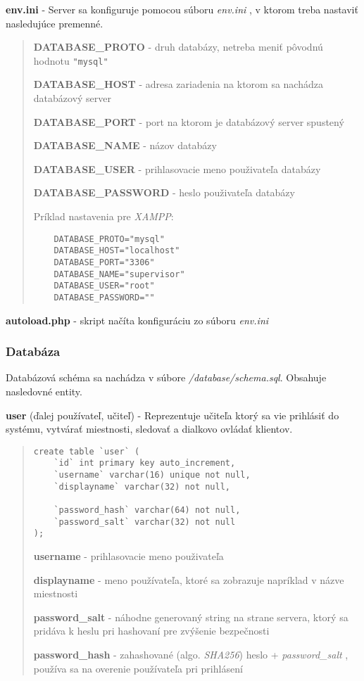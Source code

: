 \documentclass{article}
\newcommand{\filedesc}[1]{\vspace{0.3cm} \noindent \textbf{#1}}
\newcommand{\file}[1]{\emph{#1}}
\begin{document}
\filedesc{env.ini} - Server sa konfiguruje pomocou súboru \file{env.ini} , v ktorom treba nastaviť nasledujúce premenné.

\begin{quote}
  \filedesc{DATABASE{\_}PROTO} - druh databázy, netreba meniť pôvodnú hodnotu \texttt{"mysql"}

  \filedesc{DATABASE{\_}HOST} - adresa zariadenia na ktorom sa nachádza databázový server 

  \filedesc{DATABASE{\_}PORT} - port na ktorom je databázový server spustený

  \filedesc{DATABASE{\_}NAME} - názov databázy

  \filedesc{DATABASE{\_}USER} - prihlasovacie meno použivateľa databázy

  \filedesc{DATABASE{\_}PASSWORD} - heslo použivateľa databázy

  Príklad nastavenia pre \emph{XAMPP}:

  \begin{verbatim}
    DATABASE_PROTO="mysql"
    DATABASE_HOST="localhost"
    DATABASE_PORT="3306"
    DATABASE_NAME="supervisor"
    DATABASE_USER="root"
    DATABASE_PASSWORD=""
  \end{verbatim}
\end{quote}

\filedesc{autoload.php} - skript načíta konfiguráciu zo súboru \file{env.ini}

\subsubsection{Databáza}

Databázová schéma sa nachádza v súbore \file{/database/schema.sql}. Obsahuje nasledovné entity.

\filedesc{user} (ďalej používateľ, učiteľ) - Reprezentuje učiteľa ktorý sa vie prihlásiť do systému, vytvárať miestnosti, sledovať a dialkovo ovládať klientov.
\begin{quote}

\begin{verbatim}
create table `user` (
    `id` int primary key auto_increment,
    `username` varchar(16) unique not null,
    `displayname` varchar(32) not null,

    `password_hash` varchar(64) not null,
    `password_salt` varchar(32) not null
);
\end{verbatim}

\filedesc{username} - prihlasovacie meno použivateľa

\filedesc{displayname} - meno používateľa, ktoré sa zobrazuje napríklad v názve miestnosti

\filedesc{password{\_}salt} - náhodne generovaný string na strane servera, ktorý sa pridáva k heslu pri hashovaní pre zvýšenie bezpečnosti

\filedesc{password{\_}hash} - zahashované (algo. \emph{SHA256}) heslo + \emph{password{\_}salt} , používa sa na overenie používateľa pri prihlásení

\end{quote}
\end{document}
